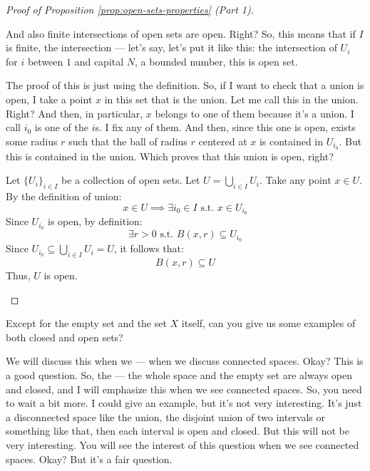 \begin{proof}[Proof of Proposition \ref{prop:open-sets-properties} (Part 1)]
\begin{spoken-clean}[00:13:43 - 00:15:50]
And also finite intersections of open sets are open. Right? So, this means that if $I$ is finite, the intersection --- let's say, let's put it like this: the intersection of $U_i$ for $i$ between $1$ and capital $N$, a bounded number, this is open set. 

The proof of this is just using the definition. So, if I want to check that a union is open, I take a point $x$ in this set that is the union. Let me call this in the union. Right? And then, in particular, $x$ belongs to one of them because it's a union. I call $i_0$ is one of the $i$s. I fix any of them. And then, since this one is open, exists some radius $r$ such that the ball of radius $r$ centered at $x$ is contained in $U_{i_0}$. But this is contained in the union. Which proves that this union is open, right?
\end{spoken-clean}

\begin{math-stroke}
Let $\{U_i\}_{i \in I}$ be a collection of open sets. Let $U = \bigcup_{i \in I} U_i$.
Take any point $x \in U$. By the definition of union:
\[ x \in U \implies \exists i_0 \in I \text{ s.t. } x \in U_{i_0} \]
Since $U_{i_0}$ is open, by definition:
\[ \exists r > 0 \text{ s.t. } B(x, r) \subseteq U_{i_0} \]
Since $U_{i_0} \subseteq \bigcup_{i \in I} U_i = U$, it follows that:
\[ B(x, r) \subseteq U \]
Thus, $U$ is open.
\end{math-stroke}
\end{proof}


\begin{student-interaction}
Except for the empty set and the set $X$ itself, can you give us some examples of both closed and open sets?
\end{student-interaction}

\begin{spoken-clean}[00:18:16 - 00:19:15]
We will discuss this when we --- when we discuss connected spaces. Okay? This is a good question. So, the --- the whole space and the empty set are always open and closed, and I will emphasize this when we see connected spaces. So, you need to wait a bit more. I could give an example, but it's not very interesting. It's just a disconnected space like the union, the disjoint union of two intervals or something like that, then each interval is open and closed. But this will not be very interesting. You will see the interest of this question when we see connected spaces. Okay? But it's a fair question.
\end{spoken-clean}

